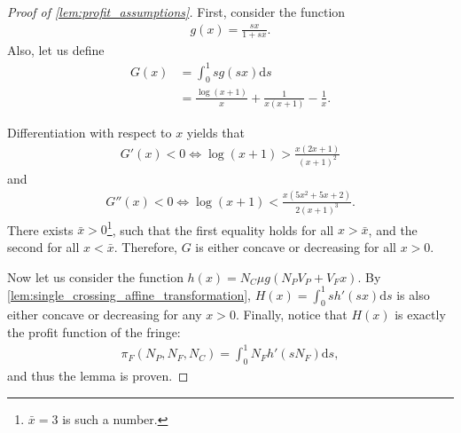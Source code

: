 \documentclass[a4paper]{article}
\newcommand{\ds}{\mathrm{d}s}
\begin{document}
\begin{proof}[Proof of \cref{lem:profit_assumptions}]
    First, consider the function
    \begin{align*}
        g(x) = \frac{sx}{1 + sx}.
    \end{align*}
    Also, let us define
    \begin{align*}
        G(x) &= \int_0^1 s g(sx) \ds \\
        &= \frac{\log(x+1)}{x} + \frac{1}{x(x+1)} - \frac{1}{x}.
    \end{align*}

    Differentiation with respect to $x$ yields that
    \begin{align*}
        G'(x) < 0 \iff \log(x+1) > \frac{x (2x+1)}{(x+1)^2}
    \end{align*}
    and
    \begin{align*}
        G''(x) < 0 \iff \log(x+1) < \frac{x (5x^2 + 5x + 2)}{2 (x+1)^3}.
    \end{align*}
    There exists $\bar{x} > 0$\footnote{
        $\bar{x} = 3$ is such a number.
    }, such that the first equality holds for all $x > \bar{x}$, and the second for all $x < \bar{x}$.
    Therefore, $G$ is either concave or decreasing for all $x > 0$.

    Now let us consider the function $h(x) = N_C \mu g(N_P V_P + V_F x)$.
    By \cref{lem:single_crossing_affine_transformation}, $H(x) = \int_0^1 s h'(sx) \ds$ is also either concave or decreasing for any $x > 0$.
    Finally, notice that $H(x)$ is exactly the profit function of the fringe:
    \begin{align*}
        \pi_F(N_P, N_F, N_C) = \int_0^1 N_F h'(s N_F) \ds,
    \end{align*}
    and thus the lemma is proven.
\end{proof}
\end{document}
